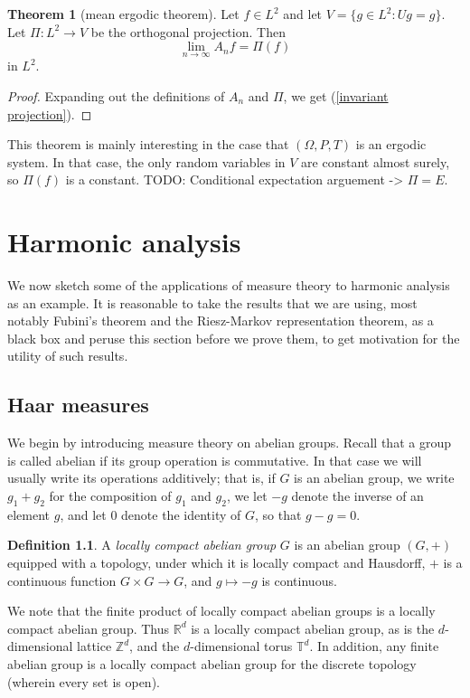 \documentclass[12pt]{book}
\newcommand{\ZZ}{\mathbb{Z}}
\newcommand{\RR}{\mathbb{R}}
\newcommand{\Torus}{\mathbb{T}}
\newcommand{\dfn}[1]{\emph{#1}\index{#1}}
\theoremstyle{definition}
\newtheorem{theorem}{Theorem}[section]
\newtheorem{definition}[theorem]{Definition}
\begin{document}
\begin{theorem}[mean ergodic theorem]
Let $f \in L^2$ and let $V = \{g \in L^2: Ug = g\}$.
Let $\Pi: L^2 \to V$ be the orthogonal projection.
Then
$$\lim_{n \to \infty} A_nf = \Pi(f)$$
in $L^2$.
\end{theorem}
\begin{proof}
Expanding out the definitions of $A_n$ and $\Pi$, we get (\ref{invariant projection}).
\end{proof}

This theorem is mainly interesting in the case that $(\Omega, P, T)$ is an ergodic system.
In that case, the only random variables in $V$ are constant almost surely, so $\Pi(f)$ is a constant.
TODO: Conditional expectation arguement -> $\Pi = E$.


\chapter{Harmonic analysis}

We now sketch some of the applications of measure theory to harmonic analysis as an example.
It is reasonable to take the results that we are using, most notably Fubini's theorem and the Riesz-Markov representation theorem, as a black box and peruse this section before we prove them, to get motivation for the utility of such results.

\section{Haar measures}
We begin by introducing measure theory on abelian groups. Recall that a group is called abelian if its group operation is commutative.
In that case we will usually write its operations additively; that is, if $G$ is an abelian group, we write $g_1 + g_2$ for the composition of $g_1$ and $g_2$, we let $-g$ denote the inverse of an element $g$, and let $0$ denote the identity of $G$, so that $g - g = 0$.

\begin{definition}
A \dfn{locally compact abelian group} $G$ is an abelian group $(G, +)$ equipped with a topology, under which it is locally compact and Hausdorff, $+$ is a continuous function $G \times G \to G$, and $g \mapsto -g$ is continuous.
\end{definition}

We note that the finite product of locally compact abelian groups is a locally compact abelian group.
Thus $\RR^d$ is a locally compact abelian group, as is the $d$-dimensional lattice $\ZZ^d$, and the $d$-dimensional torus $\Torus^d$.
In addition, any finite abelian group is a locally compact abelian group for the discrete topology (wherein every set is open).
\end{document}
